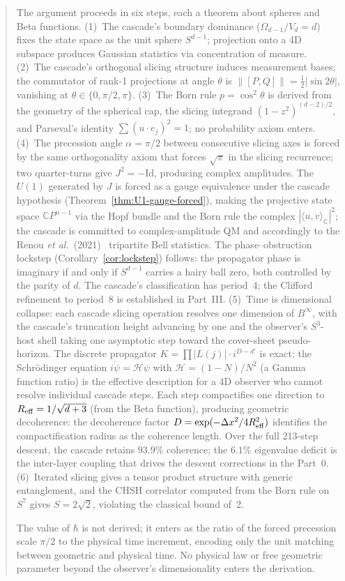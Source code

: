 \documentclass[12pt,a4paper]{article}
\begin{document}
\begin{abstract}
The argument proceeds in six steps, each a theorem about spheres and Beta functions.
(1)~The cascade's boundary dominance ($\Omega_{d-1}/V_d = d$) fixes the state space as the
unit sphere $S^{d-1}$; projection onto a 4D subspace produces Gaussian statistics via
concentration of measure. (2)~The cascade's orthogonal slicing structure induces measurement
bases; the commutator of rank-1 projections at angle $\theta$ is
$\|[P,Q]\| = \tfrac{1}{2}|\sin 2\theta|$, vanishing at $\theta\in\{0,\pi/2,\pi\}$.
(3)~The Born rule $p = \cos^2\theta$ is derived from the geometry of the spherical cap, the
slicing integrand $(1-z^2)^{(d-2)/2}$, and Parseval's identity $\sum(u\cdot e_j)^2 = 1$;
no probability axiom enters. (4)~The precession angle $\alpha = \pi/2$ between consecutive
slicing axes is forced by the same orthogonality axiom that forces $\sqrt{\pi}$ in the
slicing recurrence; two quarter-turns give $J^2 = -\mathrm{Id}$, producing complex
amplitudes. The $U(1)$ generated by $J$ is forced as a gauge equivalence under the
cascade hypothesis (Theorem~\ref{thm:U1-gauge-forced}), making the projective state
space $\mathbb{C}P^{n-1}$ via the Hopf bundle and the Born rule the complex
$|\langle u, v\rangle_{\mathbb{C}}|^2$; the cascade is committed to complex-amplitude QM
and accordingly to the Renou \emph{et al.}~(2021)~\cite{renou2021} tripartite Bell
statistics. The phase--obstruction lockstep (Corollary~\ref{cor:lockstep}) follows:
the propagator phase is imaginary if and only if $S^{d-1}$ carries a hairy ball zero,
both controlled by the parity of $d$. The cascade's classification has period~4; the
Clifford refinement to period~8 is established in Part~III.
(5)~Time is dimensional collapse: each cascade slicing operation resolves one dimension
of $B^\infty$, with the cascade's truncation height advancing by one and the observer's
$S^3$-host shell taking one asymptotic step toward the cover-sheet pseudo-horizon.
The discrete propagator
$K = \prod|L(j)|\cdot i^{D-d'}$ is exact; the Schr\"{o}dinger equation $i\dot\psi =
\mathcal{H}\psi$ with $\mathcal{H} = (1-N)/N^2$ (a Gamma function ratio) is the effective
description for a 4D observer who cannot resolve individual cascade steps. Each step
compactifies one direction to $R_{\rm eff} = 1/\sqrt{d+3}$ (from the Beta function),
producing geometric decoherence: the decoherence factor
$D = \exp(-\Delta x^2/4R_{\rm eff}^2)$ identifies the compactification radius as the
coherence length. Over the full 213-step descent, the cascade retains $93.9\%$ coherence;
the $6.1\%$ eigenvalue deficit is the inter-layer coupling that drives the descent
corrections in the Part~0. (6)~Iterated slicing gives a tensor product
structure with generic entanglement, and the CHSH correlator computed from the Born rule
on $S^7$ gives $S = 2\sqrt{2}$, violating the classical bound of~2.

The value of $\hbar$ is not derived; it enters as the ratio of the forced precession
scale $\pi/2$ to the physical time increment, encoding only the unit matching between
geometric and physical time. No physical law or free geometric parameter beyond the
observer's dimensionality enters the derivation.
\end{abstract}
\end{document}
